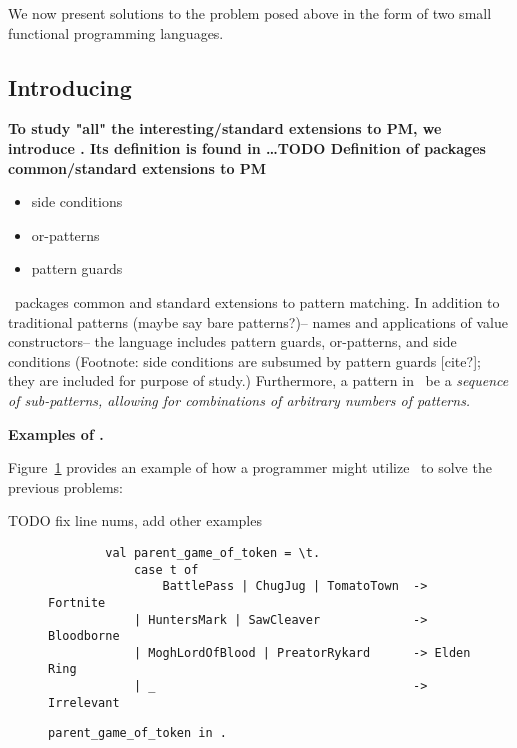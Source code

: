 \documentclass[manuscript,screen,review, 12pt]{acmart}
\begin{document}
We now present solutions to the problem posed above in the form of two small
functional programming languages. %

\subsection{Introducing \PPlus\ }

\begin{outline}[enumerate]
     \bf{To study "all" the interesting/standard extensions to PM, we introduce}
    \PPlus. Its definition is found in \dots TODO 
     \bf{Definition of \PPlus}
     \bf{{\PPlus} packages common/standard extensions to PM}
    \begin{itemize}
        \item side conditions
        \item or-patterns 
        \item pattern guards 
    \end{itemize}

    \PPlus\ packages common and standard extensions to pattern matching. In
    addition to traditional patterns (maybe say bare patterns?)-- names and
    applications of value constructors-- the language includes pattern guards,
    or-patterns, and side conditions (Footnote: side conditions are subsumed by
    pattern guards [cite?]; they are included for purpose of study.)
    Furthermore, a pattern in \PPlus\ be a \it{sequence} of sub-patterns,
    allowing for combinations of arbitrary numbers of patterns. 
    
     \bf{Examples of \PPlus. }

    Figure~\ref{fig:ppexs} provides an example of how a programmer might utilize
    \PPlus\ to solve the previous problems: 

    TODO fix line nums, add other examples 
    \begin{figure}
        \begin{center}
            \pplst 
            \begin{lstlisting}
        val parent_game_of_token = \t. 
            case t of  
                BattlePass | ChugJug | TomatoTown  -> Fortnite
            | HuntersMark | SawCleaver             -> Bloodborne
            | MoghLordOfBlood | PreatorRykard      -> Elden Ring
            | _                                    -> Irrelevant
        \end{lstlisting}
        \end{center}    
        \caption{\tt{parent\_game\_of\_token} in \PPlus.} 
        \label{fig:ppexs}
        \end{figure}
    

\end{outline}
\end{document}
